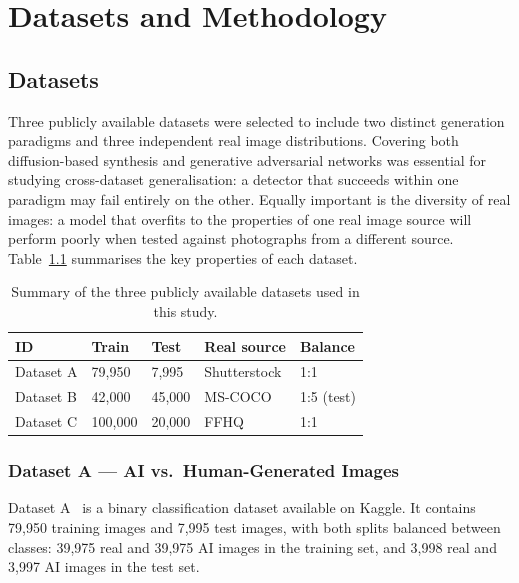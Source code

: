 \chapter{Datasets and Methodology}
\label{ch:methodology}

\section{Datasets}
\label{sec:datasets}

Three publicly available datasets were selected to include two distinct generation paradigms and three
independent real image distributions. Covering both diffusion-based synthesis and generative
adversarial networks was essential for studying cross-dataset generalisation: a detector that
succeeds within one paradigm may fail entirely on the other. Equally important is the diversity of
real images: a model that overfits to the properties of one real image source will
perform poorly when tested against photographs from a different source.
Table~\ref{tab:dataset_summary} summarises the key properties of each dataset.

\begin{table}[h!]
  \centering
  \caption{Summary of the three publicly available datasets used in this study.}
  \label{tab:dataset_summary}
  \begin{tabular}{lllll}
    \hline
    \textbf{ID} & \textbf{Train} & \textbf{Test} & \textbf{Real source} & \textbf{Balance} \\
    \hline
    Dataset A & 79,950 & 7,995  & Shutterstock & 1:1 \\
    Dataset B & 42,000 & 45,000 & MS-COCO      & 1:5 (test) \\
    Dataset C & 100,000 & 20,000 & FFHQ         & 1:1 \\
    \hline
  \end{tabular}
\end{table}

\subsection{Dataset A --- AI vs.\ Human-Generated Images}
\label{sec:dataset_a}

Dataset A~\cite{datasetA_kaggle} is a binary classification dataset available on Kaggle. It contains 79,950 training
images and 7,995 test images, with both splits balanced between classes: 39,975 real and 39,975
AI images in the training set, and 3,998 real and 3,997 AI images in the test set.

